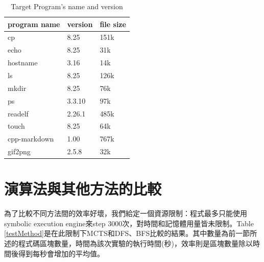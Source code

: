 \documentclass[12pt,a4paper,oneside]{book}
\begin{document}
\newcommand{\ra}[1]{\renewcommand{\arraystretch}{#1}}
\begin{table}[htbp]\centering
\caption{Target Program's name and version}
\label{binarys}
\begin{tabular}{@{}lll@{}}\toprule
program name & version & file size\\ \midrule
cp           & 8.25    & 151k \\ 
echo         & 8.25    & 31k  \\ 
hostname     & 3.16    & 14k  \\ 
ls           & 8.25    & 126k \\ 
mkdir        & 8.25    & 76k  \\ 
ps           & 3.3.10  & 97k  \\ 
readelf      & 2.26.1  & 485k \\ 
touch        & 8.25    & 64k \\ 
cpp-markdown & 1.00    & 767k \\ 
gif2png      & 2.5.8   & 32k  \\ \bottomrule
\end{tabular}
\end{table}

\section{演算法與其他方法的比較}

為了比較不同方法間的效率好壞，我們給定一個資源限制：程式最多只能使用symbolic execution engine來step 3000次，對時間和記憶體用量皆未限制。Table \ref{testMethod}是在此限制下MCTS和DFS、BFS比較的結果。其中數量為前一節所述的程式碼區塊數量，時間為該次實驗的執行時間(秒)，效率則是區塊數量除以時間後得到每秒會增加的平均值。
\end{document}
